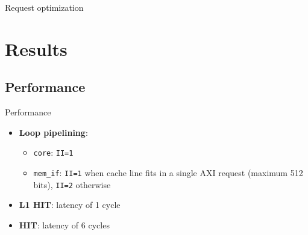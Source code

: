 \documentclass[handout]{beamer}
\begin{document}
\begin{frame}{Request optimization}
\begin{minipage}{.28\textwidth}
\begin{center}
		\end{center}
	\end{minipage}
\end{frame}
\section{Results}
\subsection{Performance}
\begin{frame}{Performance}
	\begin{itemize}
		\item \textbf{Loop pipelining}:
			\begin{itemize}
				\item \texttt{core}: \texttt{II=1}
				\item \texttt{mem\_if}: \texttt{II=1} when cache
					line fits in a single AXI request (maximum 512 bits),
					\texttt{II=2} otherwise
			\end{itemize}
		\item \textbf{L1 HIT}: latency of 1 cycle
		\item \textbf{HIT}: latency of 6 cycles
	\end{itemize}
\end{frame}
\end{document}
